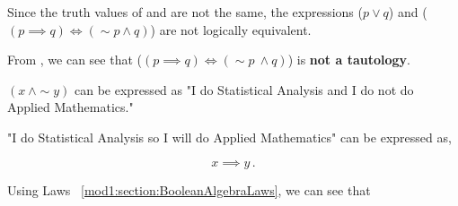 \begin{subquestions}
\begin{subsubquestions}
\subsubquestion

\begin{subsubsubquestions}
	
\subsubsubquestion

Since the truth values of  and  are not the same, the expressions ($p \lor q$) and ($(p \implies q) \iff (\sim p \land q)$) are not logically equivalent.

\subsubsubquestion

From , we can see that ($(p \implies q) \iff (\sim p ~\land q)$) is \textbf{not a tautology}.

\end{subsubsubquestions}

\end{subsubquestions}


\subquestion

\begin{subsubquestions}
	
\subsubquestion

$(x ~\land \sim y)$ can be expressed as "I do Statistical Analysis and I do not do Applied Mathematics."

\subsubquestion

"I do Statistical Analysis so I will do Applied Mathematics" can be expressed as,

\begin{equation}
	x \implies y\,.
\end{equation}

\end{subsubquestions}


\subquestion

Using Laws ~\ref{mod1:section:BooleanAlgebraLaws}, we can see that


\end{subquestions}

